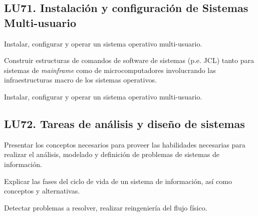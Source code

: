 \subsection{LU71. Instalación y configuración de Sistemas Multi-usuario}\label{sec:BOK-LU71}\label{sec:LU71}
\begin{LearningUnit}
\begin{LUGoal}
\item Instalar, configurar y operar un sistema operativo multi-usuario.
\end{LUGoal}

\begin{LUObjective}
\item Construir estructuras de comandos de software de sistemas (p.e. JCL) tanto para sistemas de \textit{mainframe} como de microcomputadores involucrando las infraestructuras macro de los sistemas operativos.
\item Instalar, configurar y operar un sistema operativo multi-usuario.
\end{LUObjective}
\end{LearningUnit}

\subsection{LU72. Tareas de análisis y diseño de sistemas}\label{sec:BOK-LU72}\label{sec:LU72}
\begin{LearningUnit}
\begin{LUGoal}
\item Presentar los conceptos necesarios para proveer las habilidades necesarias para realizar el análisis, modelado y definición de problemas de sistemas de información.
\end{LUGoal}

\begin{LUObjective}
\item Explicar las fases del ciclo de vida de un sistema de información, así como conceptos y alternativas.
\item Detectar problemas a resolver, realizar reingeniería del flujo físico.
\end{LUObjective}
\end{LearningUnit}

